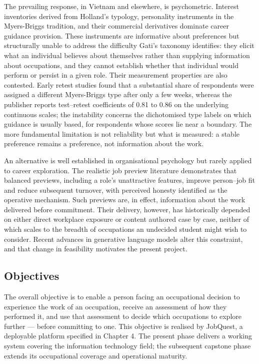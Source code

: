 The prevailing response, in Vietnam and elsewhere, is psychometric. Interest inventories derived from Holland's typology, personality instruments in the Myers-\allowbreak{}Briggs tradition, and their commercial derivatives dominate career guidance provision. These instruments are informative about preferences but structurally unable to address the difficulty Gati's taxonomy identifies: they elicit what an individual believes about themselves rather than supplying information about occupations, and they cannot establish whether that individual would perform or persist in a given role. Their measurement properties are also contested. Early retest studies found that a substantial share of respondents were assigned a different Myers-\allowbreak{}Briggs type after only a few weeks\cite{r6}, whereas the publisher reports test--retest coefficients of 0.81 to 0.86 on the underlying continuous scales\cite{r7}; the instability concerns the dichotomised type labels on which guidance is usually based, for respondents whose scores lie near a boundary. The more fundamental limitation is not reliability but what is measured: a stable preference remains a preference, not information about the work.

An alternative is well established in organisational psychology but rarely applied to career exploration. The realistic job preview literature demonstrates that balanced previews, including a role's unattractive features, improve person--job fit and reduce subsequent turnover, with perceived honesty identified as the operative mechanism\cite{r8,r9}. Such previews are, in effect, information about the work delivered before commitment. Their delivery, however, has historically depended on either direct workplace exposure or content authored case by case, neither of which scales to the breadth of occupations an undecided student might wish to consider. Recent advances in generative language models alter this constraint, and that change in feasibility motivates the present project.

\subsection{Objectives}

The overall objective is to enable a person facing an occupational decision to experience the work of an occupation, receive an assessment of how they performed it, and use that assessment to decide which occupations to explore further --- before committing to one. This objective is realised by JobQuest, a deployable platform specified in Chapter 4. The present phase delivers a working system covering the information technology field; the subsequent capstone phase extends its occupational coverage and operational maturity.

